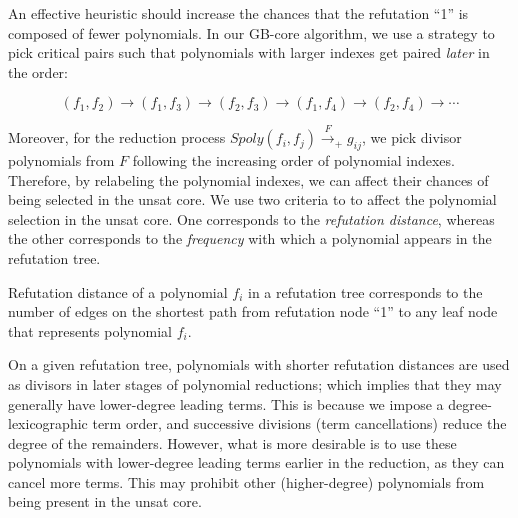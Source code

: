 An effective heuristic should increase the chances that the refutation
``1'' is composed of fewer polynomials.  In our GB-core algorithm, we
use a strategy to pick critical pairs such that polynomials with
larger indexes get paired {\it later} in the order:

$$(f_1,f_2)\to(f_1,f_3)\to(f_2,f_3)\to(f_1,f_4)\to(f_2,f_4)\to\cdots$$

Moreover, for the reduction process
$Spoly(f_i,f_j)\xrightarrow{F}_+g_{ij}$, we pick divisor polynomials from
$F$ following the increasing order of polynomial indexes. Therefore,
by relabeling the polynomial indexes, we can affect their
chances of being selected in the unsat core. We use two criteria to
to affect the polynomial selection in the unsat core. One corresponds
to the \emph{refutation distance}, whereas the other corresponds to
the {\it frequency} with which a polynomial appears in the refutation
tree.  

\begin{Definition}
Refutation distance of a polynomial $f_i$ in a refutation tree
corresponds to the number of edges on the shortest path from refutation
node ``1'' to any leaf node that represents polynomial $f_i$. 
\end{Definition}

On a given refutation tree, polynomials with shorter refutation
distances are used as divisors in later stages of polynomial
reductions; which implies that they may generally have lower-degree
leading terms. This is because we impose a degree-lexicographic term
order, and successive divisions (term cancellations) reduce the degree
of the remainders. However, what is more desirable is to use these
polynomials with lower-degree leading terms earlier in the reduction,
as they can cancel more terms. This may prohibit other (higher-degree)
polynomials from being present in the unsat core. 



